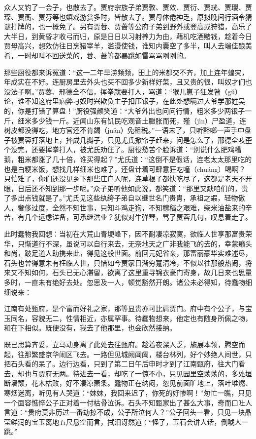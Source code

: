 \documentclass[12pt,oneside]{book}
\begin{document}
众人又钓了一会子，也散去了。贾府宗族子弟贾敦、贾效、贾衍、贾珖、贾璎、贾琛、贾蘅、贾芬等也嬉戏游赏多时，皆散去了。贾母体倦神乏，原拟晚间行酒令猜谜打牌的，也一概免了。另有贾蓉、贾蔷等公府子弟到野外或登高或狩猎，高乐了大半日，到黄昏才收弓而归，原是日日以习射养力为由，藉机吃酒赌钱，趁着今日贾母高兴，想效仿往日烹猪宰羊，滥漫使钱，谁知内囊空了多半，叫人去端佳酿美肴，一时却叫不回送菜的，蓉、蔷等都暴跳如雷骂骂咧咧的。

那些厨役都来诉冤道：“这一二年旱涝频频，田上的米都交不齐，加上连年蝗灾，年成实在不好。连厨房里去外头也买不回多少新样好菜，且又贵的很，叫奴才们也没法子啊。”贾蓉、邢德全不信，挥拳就要打人，骂道：“猴儿崽子狂发瞽（gǔ）论，谁不知这府里痼弊刁奴时兴欺负主子扣压银子，在此处想瞒过大爷学那姓吴的，你是打错了算盘！”厨役强颜笑道：“大爷外出也问问行情，粗米多少两银子一斤，细米多少钱一斤。近闻山东有饥民吃观音土臌胀而死，殣（jìn）尸盈道，连树皮都没得吃，地方官还不肯蠲（juān）免租税。”一语未了，只听豁啷一声手中盘子被贾蓉打落地上，摔成几瓣子，只见尤氏掀帘子赶来，问是怎么了，邢德全吱歪个没完，还要挥拳打人，被尤氏劝住了。厨役愁苦个脸诉道：“别说什么肥鸡糟鹅，粗米都涨了几十倍，谁买得起？”尤氏道：“这倒不是假话，连老太太那里吃的也是白粳米饭，想找几样细米也难了，还盘计着可肆意狂吃噇（chuáng）喝啊？只怕难了，你们还没见乡下那些庄户人呢，连草根子都快吃尽了，这都是老天不开眼，日后还不知到那一步呢。”众子弟听他如此说，都笑道：“那里又缺咱们的，贵了多出点钱就是了。”尤氏见这些纨绔子弟自以继世名门贵冑，承祖之嘏，轻物傲人，奢侈过度，全然不知世事，只知斗鸡走狗，不知稼穑之艰难，柴米油盐来的辛苦，有几个远虑详备，可承继洪业？犹似对牛弹琴，骂了贾蓉几句，叹息着走了。

此时蠢物我回想：当初在大荒山青埂峰下，因不耐凄凉寂寞，欲临人世享那富贵荣华，只惭道行不深，虽说可以自行来去，无奈地天之广非我能飞的去的，幸蒙癞头和尚，跛足道人助携来此，得见这般世面。前回元妃省亲，那富丽豪华实难述尽，石头也曾得意未有枉临人世，只惜如今贾家日渐穷蹇清冷，不似以往那般热闹，将来又不知如何，石头已无心滞留，欲离了这里重寻锦衣豪门寄身，故几日来也思量多时，一直未有绝好去处。忽思及一人，顿觉豁然开朗。诸公未必得知，待蠢物细细说来：

江南有处甄府，是个富而好礼之家，那等显贵亦可比肩贾门。府中有个公子，与宝玉同名，容貌无二，性情相近，亦属罕事。待蠢物想来，他定也有随身所佩之物，和在下相似。既便没有，我去了他那里，也会欣然接纳。

既已思算齐妥，立马动身离了此处去往甄府。趁着夜深人乏，施展本领，腾空而起，往那繁盛京华闹区飞去。一路但见城阙阊阖，楼台林列，好个妙绝人间世，只把石头看的呆了。边行边看，只到了第二日午后申时才到了江南甄府，往大门看去，却也与贾府无两。待进去一看，却吃了一惊不小，只见园里空荡荡的，多处垣断墙颓，花木枯败，好不凄凉萧条。蠢物正在纳闷，忽见前面旷地上，落叶堆燃、寒烟迷离，听见有人哭道：“妹妹，我回来迟了，你死的好惨啊！”匆忙一瞧，只见一个面容憔悴公子正对着一付枯骨泣诉。石头不知甄家出了甚么大事，奇而口吐人言道：“贵府莫非历过一番劫掠不成，公子所泣何人？”公子回头一看，只见一块晶莹鲜润的宝玉离地五尺悬空而言，拭泪讶然道：“怪了，玉石会讲人话，倒唬人一跳。”
\end{document}

